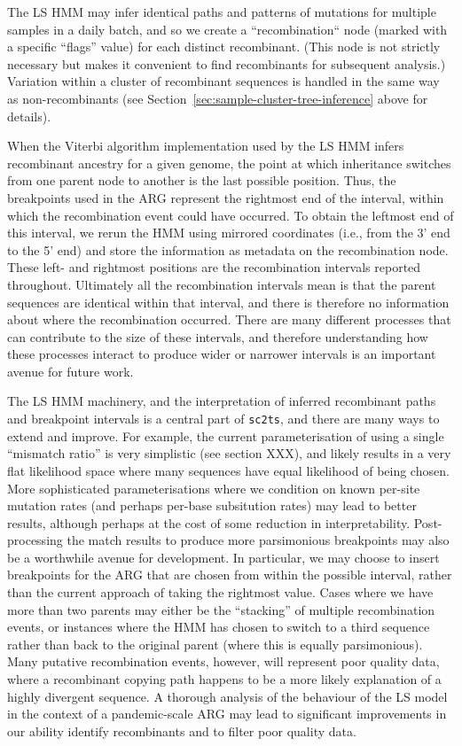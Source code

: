 \documentclass{article}
\begin{document}
The LS HMM may infer identical paths and patterns of mutations
for multiple samples in a daily batch, and so we
create a ``recombination`` node (marked with a specific ``flags'' value)
for each distinct recombinant. (This node is not strictly necessary
but makes it convenient to find recombinants for subsequent analysis.)
Variation within a cluster
of recombinant sequences is handled in the same way as non-recombinants
(see Section~\ref{sec:sample-cluster-tree-inference} above for details).

When the Viterbi algorithm implementation used by the LS HMM infers
recombinant ancestry for a given genome, the point at which inheritance
switches from one parent node to another is the last possible
position.
Thus, the breakpoints used in the ARG represent the rightmost end of the
interval, within which the recombination event could have occurred. To obtain
the leftmost end of this interval, we rerun the HMM using mirrored coordinates
(i.e., from the 3’ end to the 5’ end) and store the information as
metadata on the recombination node.
These left- and rightmost positions
are the recombination intervals reported throughout.
Ultimately all the recombination intervals mean is that the parent sequences
are identical within that interval, and there is therefore no information
about where the recombination occurred. There are many different processes
that can contribute to the size of these intervals, and therefore
understanding how these processes interact to produce wider or narrower
intervals is an important avenue for future work.

The LS HMM machinery, and the interpretation of inferred recombinant paths and
breakpoint intervals is a central part of \texttt{sc2ts}, and there are many
ways to extend and improve. For example, the current parameterisation of using
a single ``mismatch ratio'' is very simplistic (see section XXX), and likely
results in a very flat likelihood space where many sequences have equal
likelihood of being chosen. More sophisticated parameterisations where we
condition on known per-site mutation rates (and perhaps per-base subsitution
rates) may lead to better results, although perhaps at the cost of some
reduction in interpretability. Post-processing the match results to produce
more parsimonious breakpoints may also be a worthwhile avenue for development.
In particular, we may choose to insert breakpoints for the ARG that are chosen
from within the possible interval, rather than the current approach of taking
the rightmost value. Cases where we have more than two parents may either be
the ``stacking'' of multiple recombination events, or instances where
the HMM has chosen to switch to a third sequence rather than back to
the original parent (where this is equally parsimonious). Many putative
recombination events, however, will represent poor quality data, where
a recombinant copying path happens to be a more likely explanation
of a highly divergent sequence.
A thorough analysis of the behaviour of the LS model in the context
of a pandemic-scale ARG may lead to significant improvements in our
ability identify recombinants and to filter poor quality data.
\end{document}
